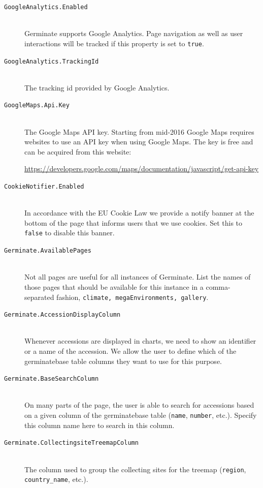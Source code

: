 \begin{description}
    \item[\texttt{GoogleAnalytics.Enabled}] \\Germinate supports Google Analytics. Page navigation as well as user interactions will be tracked if this property is set to \texttt{true}.
    \item[\texttt{GoogleAnalytics.TrackingId}\nonoptionalif] \floatright{[String]}\\ The tracking id provided by Google Analytics.
    \item[\texttt{GoogleMaps.Api.Key}\nonoptionalif] \floatright{[String]}\\ The Google Maps API key. Starting from mid-2016 Google Maps requires websites to use an API key when using Google Maps. The key is free and can be acquired from this website:
    \begin{center}
    	\url{https://developers.google.com/maps/documentation/javascript/get-api-key}
    \end{center}
    \noindent
    \item[\texttt{CookieNotifier.Enabled}] \\ In accordance with the EU Cookie Law \cite{CookieLaw} we provide a notify banner at the bottom of the page that informs users that we use cookies. Set this to \texttt{false} to disable this banner.
    \item[\texttt{Germinate.AvailablePages}\nonoptional] \floatright{[CSV]}\\Not all pages are useful for all instances of Germinate. List the names of those pages that should be available for this instance in a comma-separated fashion, \eg \texttt{climate, megaEnvironments, gallery}.
    \item[\texttt{Germinate.AccessionDisplayColumn}] \\Whenever accessions are displayed in charts, we need to show an identifier or a name of the accession. We allow the user to define which of the germinatebase table columns they want to use for this purpose.
    \item[\texttt{Germinate.BaseSearchColumn}] \\On many parts of the page, the user is able to search for accessions based on a given column of the germinatebase table (\eg \texttt{name}, \texttt{number}, etc.). Specify this column name here to search in this column.
    \item[\texttt{Germinate.CollectingsiteTreemapColumn}] \\The column used to group the collecting sites for the treemap (\eg \texttt{region}, \texttt{country\_name}, etc.).

\end{description}
